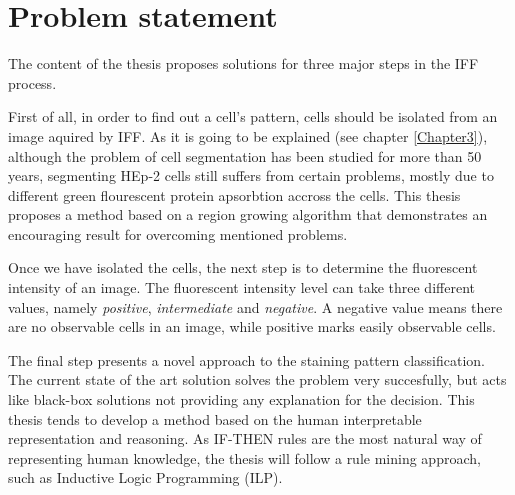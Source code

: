 \section{Problem statement}

The content of the thesis proposes solutions for three major steps in the IFF process.

First of all, in order to find out a cell's pattern, cells should be isolated from an image aquired by IFF. As it is going to be explained (see chapter \ref{Chapter3}), although the problem of cell segmentation has been studied for more than 50 years, segmenting HEp-2 cells still suffers from certain problems, mostly due to different green flourescent protein apsorbtion accross the cells. This thesis proposes a method based on a region growing algorithm that demonstrates an encouraging result for overcoming mentioned problems. 

Once we have isolated the cells, the next step is to determine the fluorescent intensity of an image. The fluorescent intensity level can take three different values, namely \textit{positive}, \textit{intermediate} and \textit{negative}. A negative value means there are no observable cells in an image, while positive marks easily observable cells.  

The final step presents a novel approach to the staining pattern classification. The current state of the art solution solves the problem very succesfully, but acts like  black-box solutions not providing any explanation for the decision. This thesis tends to develop a method based on the human interpretable representation and reasoning. As IF-THEN rules are the most natural way of representing human knowledge,  the thesis will follow a rule mining approach, such as Inductive Logic Programming (ILP).